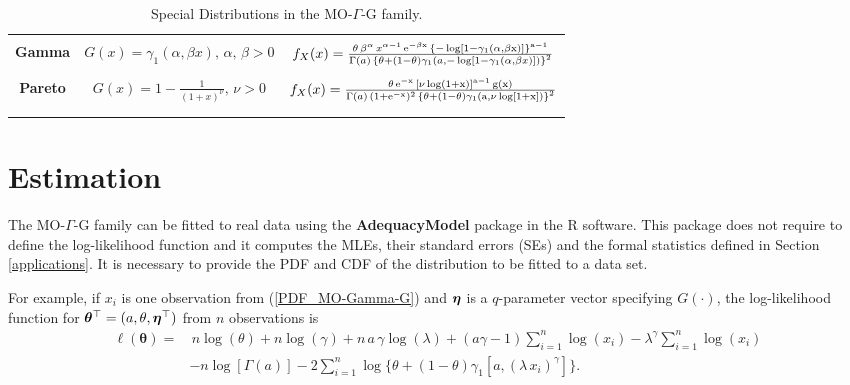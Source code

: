 \documentclass[12pt,a4paper]{article} %
\newcommand{\etn}{{\mbox{\boldmath $\eta$}}}
\begin{document}
\begin{landscape}
\begin{table}[htbp]
\begin{tabular}{c|c|c}
\hline
{} & {} & {} \\
\textbf{Gamma} &  $G(x)=\gamma_1(\alpha,\beta x),\,\alpha,\,\beta>0$ & $f_{X}(x)=\frac{\theta\,\beta^{\alpha}\,x^{\alpha-1}\,\rm{e}^{-\beta x}\,\left\{ -\log[1-\gamma_1(\alpha,\beta x)] \right\}^{a-1}}{\Gamma(a)\,\left\{\theta+(1-\theta)\gamma_1\left( a, -\log \left[1-\gamma_1(\alpha,\beta x)\right]\right)\right\}^{2}}$ \\
{} & {} & {} \\                                                                                                                                                                                                                                                                           \hline
\textbf{Pareto} &  $G(x)=1-\frac{1}{(1+x)^\nu},\,\nu>0$ & $f_{X}(x)=\frac{\theta \, \rm{e}^{-x}\, \left[\nu\log(1+x)\right]^{a-1}\, g(x)}{\Gamma(a)\,(1+\rm{e}^{-x})^2\,\left\{\theta+(1-\theta)\gamma_1\left( a, \nu\log[1+x]\right)\right\}^{2}}$\\
{} & {} & {} \\
\hline
{} & {} & {} \\
\hline
\end{tabular}
\caption{Special Distributions in the  MO-$\Gamma$-G family.}
\end{table}
\end{landscape}

\section{Estimation}\label{estimation}

The  MO-$\Gamma$-G family can be  fitted to real data using the {\bf AdequacyModel} package in the {\sf R} software.
This packa\-ge does not require to define the log-likelihood function and it computes the MLEs, their standard errors (SEs)
and the formal statistics defined in Section \ref{applications}. It is necessary to provide the
PDF and CDF of the distribution to be fitted to a data set.

For example, if $x_i$ is one observation from (\ref{PDF_MO-Gamma-G}) and $\etn$ is a $q$-parameter vector specifying $G(\cdot)$,
the log-likelihood function for $\boldsymbol{\theta}^\top=(a,\theta,\etn^\top)$ from $n$ observations is
\begin{align}\label{loglik}
\ell (\boldsymbol{\theta})=&\,n\log (\theta)+n\log(\gamma)+n\, a\, \gamma \log(\lambda)+(a\gamma-1)\sum_{i=1}^n{\log(x_i)}-\lambda^\gamma\sum_{i=1}^n{\log(x_i)}\nonumber \\ &
-n\log[\Gamma(a)]-2\sum_{i=1}^n{\log\{\theta+(1-\theta)\gamma_1[a,(\lambda\,x_i)^\gamma]\}}.
\end{align}
\end{document}
